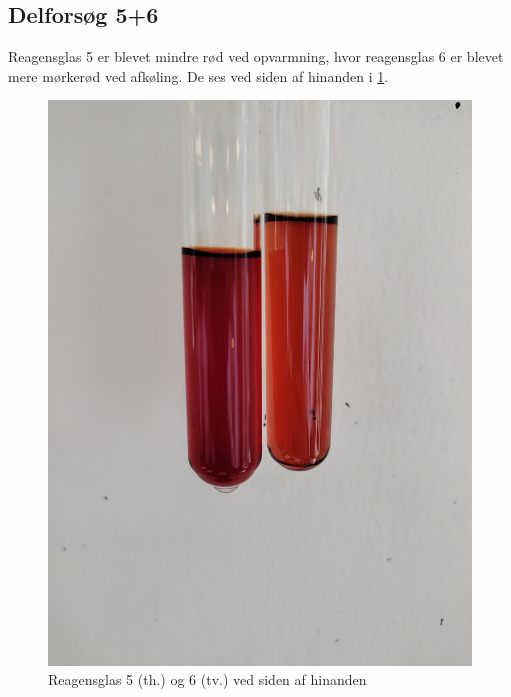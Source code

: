 \documentclass{report}
\begin{document}
\subsection*{Delforsøg 5+6}
Reagensglas 5 er blevet mindre rød ved opvarmning, hvor reagensglas 6 er blevet mere mørkerød ved afkøling.
De ses ved siden af hinanden i \cref{fig:for5}.
\begin{figure}[H]
\begin{center}
  \includegraphics[scale=0.18]{for5.jpeg}
\end{center}
  \caption{Reagensglas 5 (th.) og 6 (tv.) ved siden af hinanden}
\label{fig:for5}
\end{figure}
\end{document}
